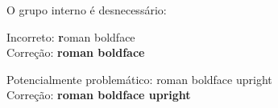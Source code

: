 \documentclass[12pt]{article}
\begin{document}
O grupo interno é desnecessário: {}

Incorreto: {\rmfamily\textbf roman boldface}\\
Correção:  {\rmfamily\textbf{roman boldface}}

Potencialmente problemático: {\rmfamily\textbf\upshape roman boldface upright}\\
Correção: {\rmfamily\textbf{\upshape roman boldface upright}}
\end{document}

